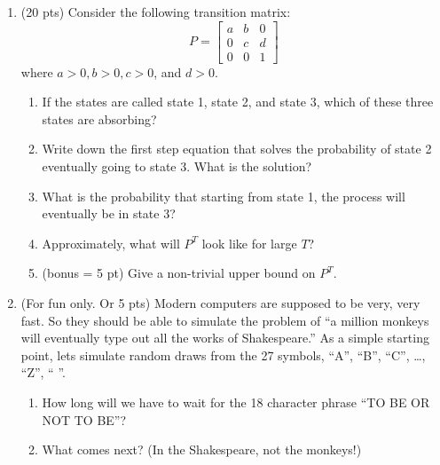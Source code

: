 \documentclass[12pt]{article}
\begin{document}
\begin{enumerate}
\item (20 pts) Consider the following transition matrix:
\begin{displaymath}
P = \left[\begin{array}{ccc}
             a & b & 0 \\
             0 & c & d \\
             0 & 0 & 1
         \end{array}
     \right]
\end{displaymath}
where $a > 0, b > 0, c > 0$, and  $d > 0$.
\begin{enumerate}
\item If the states are called state 1, state 2, and state 3, which of
these three states are absorbing?
\item Write down the first step equation that solves the probability
of state 2 eventually going to state 3.  What is the solution?
\item What is the probability that starting from state 1, the process
will eventually be in state 3?
\item Approximately, what will $P^T$ look like for large $T$?
\item (bonus = 5 pt) Give a non-trivial upper bound on $P^T$.
\end{enumerate}

\item (For fun only.  Or 5 pts) Modern computers are supposed to be
  very, very fast.  So they should be able to simulate the problem of
  ``a million monkeys will eventually type out all the works of
  Shakespeare.''  As a simple starting point, lets simulate random
  draws from the 27 symbols, ``A'', ``B'', ``C'', \ldots, ``Z'', ``
  ''.
\begin{enumerate}
\item How long will we have to wait for the 18 character phrase ``TO
BE OR NOT TO BE''?
\item What comes next?  (In the Shakespeare, not the monkeys!)
\end{enumerate}

\end{enumerate}
\end{document}
